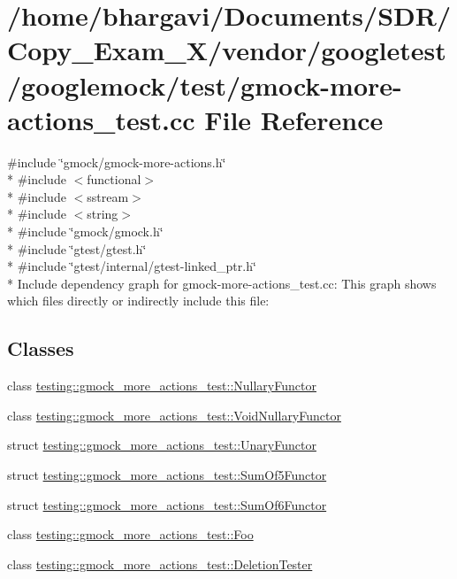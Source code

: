 \hypertarget{gmock-more-actions__test_8cc}{}\section{/home/bhargavi/\+Documents/\+S\+D\+R/\+Copy\+\_\+\+Exam\+\_\+X/vendor/googletest/googlemock/test/gmock-\/more-\/actions\+\_\+test.cc File Reference}
\label{gmock-more-actions__test_8cc}
{\ttfamily \#include \char`\"{}gmock/gmock-\/more-\/actions.\+h\char`\"{}}\\*
{\ttfamily \#include $<$functional$>$}\\*
{\ttfamily \#include $<$sstream$>$}\\*
{\ttfamily \#include $<$string$>$}\\*
{\ttfamily \#include \char`\"{}gmock/gmock.\+h\char`\"{}}\\*
{\ttfamily \#include \char`\"{}gtest/gtest.\+h\char`\"{}}\\*
{\ttfamily \#include \char`\"{}gtest/internal/gtest-\/linked\+\_\+ptr.\+h\char`\"{}}\\*
Include dependency graph for gmock-\/more-\/actions\+\_\+test.cc\+:
This graph shows which files directly or indirectly include this file\+:
\subsection*{Classes}
\begin{DoxyCompactItemize}
\item 
class \hyperlink{classtesting_1_1gmock__more__actions__test_1_1_nullary_functor}{testing\+::gmock\+\_\+more\+\_\+actions\+\_\+test\+::\+Nullary\+Functor}
\item 
class \hyperlink{classtesting_1_1gmock__more__actions__test_1_1_void_nullary_functor}{testing\+::gmock\+\_\+more\+\_\+actions\+\_\+test\+::\+Void\+Nullary\+Functor}
\item 
struct \hyperlink{structtesting_1_1gmock__more__actions__test_1_1_unary_functor}{testing\+::gmock\+\_\+more\+\_\+actions\+\_\+test\+::\+Unary\+Functor}
\item 
struct \hyperlink{structtesting_1_1gmock__more__actions__test_1_1_sum_of5_functor}{testing\+::gmock\+\_\+more\+\_\+actions\+\_\+test\+::\+Sum\+Of5\+Functor}
\item 
struct \hyperlink{structtesting_1_1gmock__more__actions__test_1_1_sum_of6_functor}{testing\+::gmock\+\_\+more\+\_\+actions\+\_\+test\+::\+Sum\+Of6\+Functor}
\item 
class \hyperlink{classtesting_1_1gmock__more__actions__test_1_1_foo}{testing\+::gmock\+\_\+more\+\_\+actions\+\_\+test\+::\+Foo}
\item 
class \hyperlink{classtesting_1_1gmock__more__actions__test_1_1_deletion_tester}{testing\+::gmock\+\_\+more\+\_\+actions\+\_\+test\+::\+Deletion\+Tester}
\end{DoxyCompactItemize}
